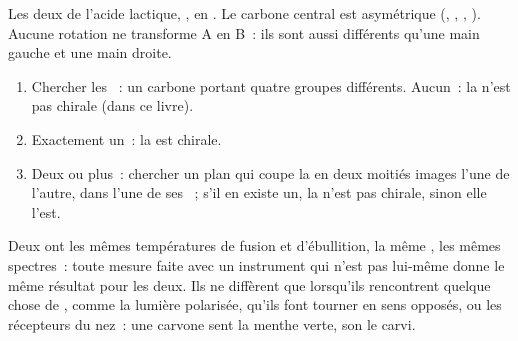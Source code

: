 \begin{omfigure}

{\small Les deux  de l'acide lactique,
, en . Le carbone central est
asymétrique (, ,
, ). Aucune rotation ne transforme A en B~: ils sont
aussi différents qu'une main gauche et une main droite.}
\end{omfigure}

\begin{method}\label{met:g12:stereochemistry:chiral}
\begin{enumerate}
  \item Chercher les ~: un carbone portant quatre
        groupes différents. Aucun~: la  n'est pas chirale (dans
        ce livre).
  \item Exactement un~: la  est chirale.
  \item Deux ou plus~: chercher un plan qui coupe la  en deux
        moitiés images l'une de l'autre, dans l'une de ses ~;
        s'il en existe un, la  n'est pas chirale, sinon elle
        l'est.
\end{enumerate}
\end{method}

\begin{remark}\label{rem:g12:stereochemistry:same}
Deux  ont les mêmes températures de fusion et d'ébullition,
la même , les mêmes spectres~: toute mesure faite avec un
instrument qui n'est pas lui-même  donne le même résultat pour les
deux. Ils ne diffèrent que lorsqu'ils rencontrent quelque chose de
, comme la lumière polarisée, qu'ils font tourner en sens opposés,
ou les récepteurs du nez~: une carvone sent la menthe verte, son
 le carvi.
\end{remark}

